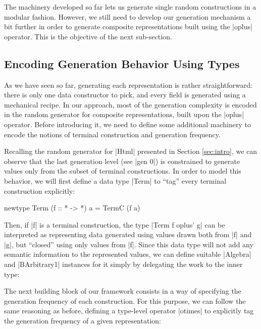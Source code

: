 %
%
The machinery developed so far lets us generate single random constructions in a
modular fashion.
%
However, we still need to develop our generation mechanism a bit further in
order to generate composite representations built using the |oplus| operator.
%
This is the objective of the next sub-section.


%
\subsection{Encoding Generation Behavior Using Types}

As we have seen so far, generating each representation is rather
straightforward: there is only one data constructor to pick, and every field is
generated using a mechanical recipe.
%
In our approach, most of the generation complexity is encoded in the random
generator for composite representations, built upon the |oplus| operator.
%
Before introducing it, we need to define some additional machinery to encode the
notions of terminal construction and generation frequency.
%

Recalling the random generator for |Html| presented in Section \ref{sec:intro},
we can observe that the last generation level (see |gen 0|) is constrained to
generate values only from the subset of terminal constructions.
%
In order to model this behavior, we will first define a data type |Term| to
``tag'' every terminal construction explicitly:

\begin{code}
newtype Term (f :: * -> *) a = TermC (f a)
\end{code}
%
Then, if |f| is a terminal construction, the type |Term f oplus' g| can be
interpreted as representing data generated using values drawn both from |f| and
|g|, but ``closed'' using only values from |f|.
%
Since this data type will not add any semantic information to the represented
values, we can define suitable |Algebra| and |BArbitrary1| instances for it
simply by delegating the work to the inner type:



The next building block of our framework consists in a way of specifying the
generation frequency of each construction.
%
For this purpose, we can follow the same reasoning as before, defining a
type-level operator |otimes| to explicitly tag the generation frequency of a
given representation:

